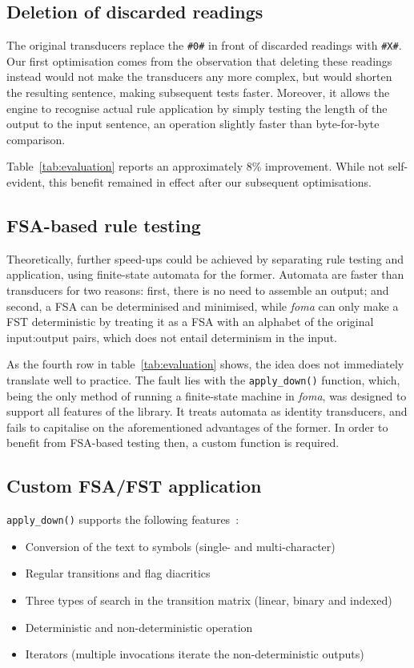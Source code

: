 \documentclass[11pt]{article}
\begin{document}
\subsection{Deletion of discarded readings}
\label{sec:speed_deletex}

The original transducers replace the \texttt{\#0\#} in front of discarded readings
with \texttt{\#X\#}. Our first optimisation comes from the observation that
deleting these readings instead would not make the transducers any more complex,
but would shorten the resulting sentence, making subsequent tests faster.
Moreover, it allows the engine to recognise actual rule application by simply
testing the length of the output to the input sentence, an operation slightly
faster than byte-for-byte comparison.

Table~\ref{tab:evaluation} reports an approximately 8\% improvement. While not
self-evident, this benefit remained in effect after our subsequent optimisations.

\subsection{FSA-based rule testing}
\label{sec:speed_fsa}

Theoretically, further speed-ups could be achieved by separating rule testing
and application, using finite-state automata for the former. Automata are faster
than transducers for two reasons: first, there is no need to assemble an output;
and second, a FSA can be determinised and minimised, while \emph{foma} can
only make a FST deterministic by treating it as a FSA with an alphabet of the
original input:output pairs, which does not entail determinism in the input.

As the fourth row in table~\ref{tab:evaluation} shows, the idea does not immediately
translate well to practice. The fault lies with the \texttt{apply\_down()}
function, which, being the only method of running a finite-state machine in
\emph{foma}, was designed to support all features of the library. It treats
automata as identity transducers, and fails to capitalise
on the aforementioned advantages of the former. In order to benefit from 
FSA-based testing then, a custom function is required.

\subsection{Custom FSA/FST application}
\label{sec:speed_custom}

\texttt{apply\_down()} supports the following features~\cite{Hulden:2009b}:
\begin{itemize}
  \item Conversion of the text to symbols (single- and multi-character)
  \item Regular transitions and flag diacritics
  \item Three types of search in the transition matrix (linear, binary and indexed)
  \item Deterministic and non-deterministic operation
  \item Iterators (multiple invocations iterate the non-deterministic outputs)
\end{itemize}
\end{document}
